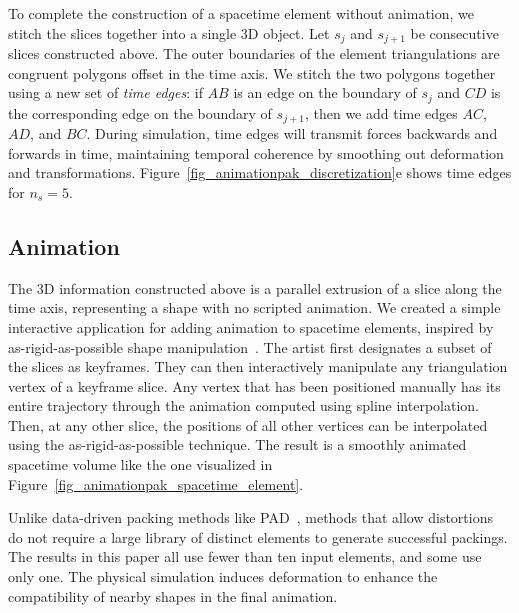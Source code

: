 To complete the construction of a spacetime element without animation,
we stitch the slices together into a single 3D object.  Let $s_j$ and
$s_{j+1}$ be consecutive slices constructed above.  The outer boundaries
of the element triangulations are congruent polygons offset in the time 
axis.  We stitch the two polygons together using a new set of 
\textit{time edges}: if $AB$ is an edge on the boundary of $s_j$ and
$CD$ is the corresponding edge on the boundary of $s_{j+1}$, then
we add time edges $AC$, $AD$, and $BC$.
During simulation, time edges will transmit forces backwards and forwards in
time, maintaining temporal coherence by smoothing out deformation and 
transformations.
Figure~\ref{fig_animationpak_discretization}e shows time edges for $n_s=5$.


\subsection{Animation}
\label{animationpak_animation}

The 3D information constructed above is a parallel extrusion of a 
slice along the time axis, representing a shape with no scripted animation.
We created a simple interactive application for adding animation to
spacetime elements, inspired by as-rigid-as-possible shape
manipulation~\cite{Igarashi2005}.  The artist first designates a subset
of the slices as keyframes.  They can then interactively manipulate
any triangulation vertex of a keyframe slice.  Any vertex that has
been positioned manually has its entire trajectory through the animation
computed using spline interpolation.  Then, at any other slice, the positions
of all other vertices can be interpolated using the as-rigid-as-possible
technique.  The result is a smoothly animated spacetime volume like the one
visualized in Figure~\ref{fig_animationpak_spacetime_element}.

Unlike data-driven packing methods like PAD~\cite{Kwan2016}, methods that
allow distortions do not require a large library of distinct elements
to generate successful packings.  The results in this paper all use
fewer than ten input elements, and some use only one.
The physical simulation induces deformation to enhance 
the compatibility of nearby shapes in the final animation.

